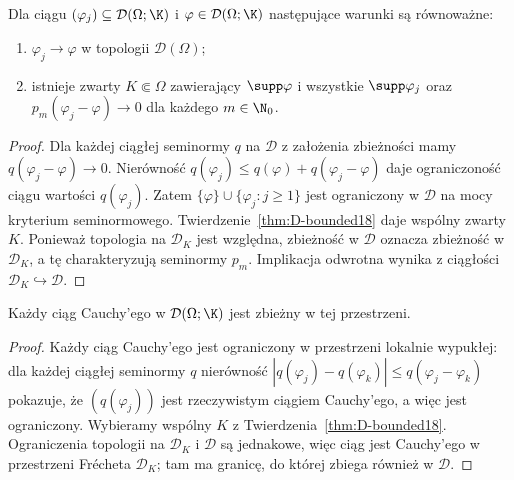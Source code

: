 \begin{twierdzenie}
\label{thm:D-sequences18}
Dla ciągu $(\varphi_j)\subseteq\mathcal D(\Omega;\K)$
i $\varphi\in\mathcal D(\Omega;\K)$ następujące warunki
są równoważne:
\begin{enumerate}
\item $\varphi_j\to\varphi$ w topologii $\mathcal D(\Omega)$;
\item istnieje zwarty $K\Subset\Omega$ zawierający
$\supp\varphi$ i wszystkie $\supp\varphi_j$ oraz
$p_m(\varphi_j-\varphi)\to0$ dla każdego $m\in\N_0$.
\end{enumerate}
\end{twierdzenie}
\begin{proof}
Dla każdej ciągłej seminormy $q$ na $\mathcal D$
z założenia zbieżności mamy $q(\varphi_j-\varphi)\to0$.
Nierówność $q(\varphi_j)\le q(\varphi)+q(\varphi_j-\varphi)$
daje ograniczoność ciągu wartości $q(\varphi_j)$.
Zatem $\{\varphi\}\cup\{\varphi_j:j\ge1\}$ jest ograniczony
w $\mathcal D$ na mocy kryterium seminormowego.
Twierdzenie~\ref{thm:D-bounded18} daje wspólny zwarty $K$.
Ponieważ topologia na $\mathcal D_K$ jest względna,
zbieżność w $\mathcal D$ oznacza zbieżność w $\mathcal D_K$,
a tę charakteryzują seminormy $p_m$.
Implikacja odwrotna wynika z ciągłości
$\mathcal D_K\hookrightarrow\mathcal D$.
\end{proof}

\begin{wniosek}
\label{cor:D-seqcomplete18}
Każdy ciąg Cauchy'ego w $\mathcal D(\Omega;\K)$ jest
zbieżny w tej przestrzeni.
\end{wniosek}
\begin{proof}
Każdy ciąg Cauchy'ego jest ograniczony w przestrzeni lokalnie
wypukłej: dla każdej ciągłej seminormy $q$ nierówność
$|q(\varphi_j)-q(\varphi_k)|\le q(\varphi_j-\varphi_k)$
pokazuje, że $(q(\varphi_j))$ jest rzeczywistym ciągiem
Cauchy'ego, a więc jest ograniczony.
Wybieramy wspólny $K$ z
Twierdzenia~\ref{thm:D-bounded18}. Ograniczenia topologii
na $\mathcal D_K$ i $\mathcal D$ są jednakowe, więc ciąg
jest Cauchy'ego w przestrzeni Fr\'echeta $\mathcal D_K$;
tam ma granicę, do której zbiega również w $\mathcal D$.
\end{proof}

